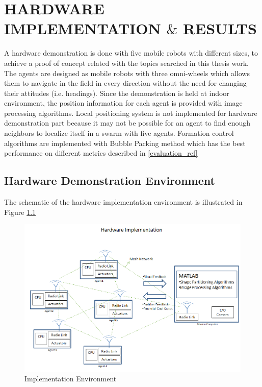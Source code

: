 

\chapter{HARDWARE IMPLEMENTATION $\&$ RESULTS}
\label{chp:hardware}









A hardware demonstration is done with five mobile robots with different sizes, to achieve a proof of concept related with the topics searched in this thesis work. The agents are designed as mobile robots with three omni-wheels which allows them to navigate in the field in every direction without the need for changing their attitudes (i.e. headings). Since the demonstration is held at indoor environment, the position information for each agent is provided with image processing algorithms. Local positioning system is not implemented for hardware demonstration part because it may not be possible for an agent to find enough neighbors to localize itself in a swarm with five agents. Formation control algorithms are implemented with Bubble Packing method which has the best performance on different metrics described in \ref{evaluation_ref}

\section{Hardware Demonstration Environment}
The schematic of the hardware implementation environment is illustrated in Figure \ref{harware_ref}
   
\begin{figure}[H]
\caption{Implementation Environment} \label{harware_ref}
\centerline{\includegraphics[scale = 0.55]{hardware}}
\end{figure} 
   
